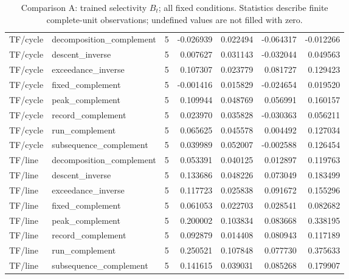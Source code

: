 \begin{table}[p]
\begin{tabular}{llrrrrr}
TF/cycle & decomposition\_complement & 5 & -0.026939 & 0.022494 & -0.064317 & -0.012266\\
TF/cycle & descent\_inverse & 5 & 0.007627 & 0.031143 & -0.032044 & 0.049563\\
TF/cycle & exceedance\_inverse & 5 & 0.107307 & 0.023779 & 0.081727 & 0.129423\\
TF/cycle & fixed\_complement & 5 & -0.001416 & 0.015829 & -0.024654 & 0.019520\\
TF/cycle & peak\_complement & 5 & 0.109944 & 0.048769 & 0.056991 & 0.160157\\
TF/cycle & record\_complement & 5 & 0.023970 & 0.035828 & -0.030363 & 0.056211\\
TF/cycle & run\_complement & 5 & 0.065625 & 0.045578 & 0.004492 & 0.127034\\
TF/cycle & subsequence\_complement & 5 & 0.039989 & 0.052007 & -0.002588 & 0.126454\\
TF/line & decomposition\_complement & 5 & 0.053391 & 0.040125 & 0.012897 & 0.119763\\
TF/line & descent\_inverse & 5 & 0.133686 & 0.048226 & 0.073049 & 0.183499\\
TF/line & exceedance\_inverse & 5 & 0.117723 & 0.025838 & 0.091672 & 0.155296\\
TF/line & fixed\_complement & 5 & 0.061053 & 0.022703 & 0.028541 & 0.082682\\
TF/line & peak\_complement & 5 & 0.200002 & 0.103834 & 0.083668 & 0.338195\\
TF/line & record\_complement & 5 & 0.092879 & 0.014408 & 0.080943 & 0.117189\\
TF/line & run\_complement & 5 & 0.250521 & 0.107848 & 0.077730 & 0.375633\\
TF/line & subsequence\_complement & 5 & 0.141615 & 0.039031 & 0.085268 & 0.179907\\
\bottomrule\end{tabular}
\caption{Comparison A: trained selectivity $B_t$; all fixed conditions. Statistics describe finite complete-unit observations; undefined values are not filled with zero.}
\label{tab:independent-effect-1}\end{table}

